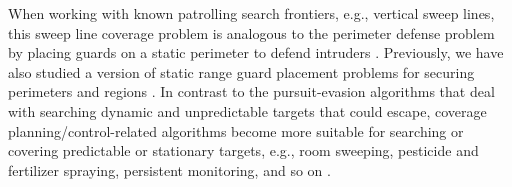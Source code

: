 When working with known patrolling search frontiers, e.g., vertical sweep lines, 
this sweep line coverage problem is analogous to the perimeter defense problem by placing guards on a static perimeter
to defend intruders \cite{shishika2020cooperative, macharet2020adaptive, chen2021optimal}.
Previously, we have also studied a version of static range guard placement problems for securing perimeters and regions \cite{fengyu2020optimally}.
In contrast to the pursuit-evasion algorithms that deal with searching dynamic and unpredictable targets that could escape, 
coverage planning/control-related algorithms become more suitable for searching or covering predictable or stationary targets,
e.g., room sweeping, pesticide and fertilizer spraying, persistent monitoring, and so on 
\cite{cortes2004coverage, oksanen2009coverage, haksar2020spatial, wei2018coverage, deng2019constrained, 
lan2013planning, cassandras2012optimal, yu2015persistent, palacios2017optimal}. 


